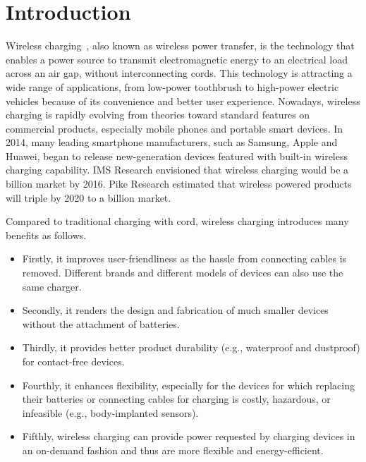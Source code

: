 \documentclass[twocolumn,10pt]{IEEEtran}
\begin{document}
\section{Introduction}

 
Wireless charging~\cite{A.2014Costanzo,J.2013Garnica}, also known as wireless power transfer, is the technology that enables a power source to transmit electromagnetic energy to an electrical load across an air gap, without interconnecting cords. This technology is attracting a wide range of applications, from low-power toothbrush to high-power electric vehicles because of its convenience and better user experience.  Nowadays, wireless charging is rapidly evolving from theories toward standard features on commercial products, especially mobile phones and portable smart devices. In 2014, many leading smartphone manufacturers, such as Samsung, Apple and Huawei, began to release new-generation devices featured with built-in wireless charging capability. IMS Research \cite{imsresearch} envisioned that wireless charging would be a  billion market by 2016. Pike Research \cite{pikeresearch} estimated that wireless powered products will triple by 2020 to a  billion market.
 





Compared to traditional charging with cord, wireless charging introduces many benefits as follows.
\begin{itemize}
\item Firstly, it improves user-friendliness as the hassle from connecting cables is removed. Different brands and different models of devices can also use the same charger.
 
\item  Secondly, it renders the design and fabrication of much smaller devices without the attachment of batteries. 
 
\item  Thirdly, it provides better product durability (e.g., waterproof and dustproof) for contact-free devices. 
  
\item  Fourthly, it enhances flexibility, especially for the devices for which replacing their batteries or connecting cables for charging is costly, hazardous, or infeasible (e.g., body-implanted sensors). 
  
\item Fifthly, wireless charging can provide power requested by charging devices in an on-demand fashion and thus are more flexible and energy-efficient. 

\end{itemize} 
\end{document}

